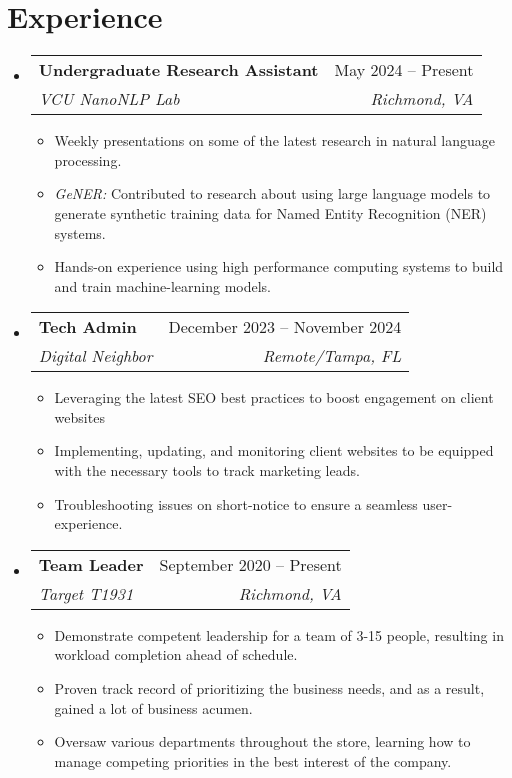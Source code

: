 \documentclass[letterpaper,11pt]{article}
\makeatletter
\newcommand{\resumeItem}[1]{
  \item\small{
    {#1 \vspace{-2pt}}
  }
}
\newcommand{\resumeSubheading}[4]{
  \vspace{-2pt}\item
    \begin{tabular*}{0.97\textwidth}[t]{l@{\extracolsep{\fill}}r}
      \textbf{#1} & #2 \\
      \textit{\small#3} & \textit{\small #4} \\
    \end{tabular*}\vspace{-7pt}
}
\newcommand{\resumeSubSubheading}[2]{
    \item
    \begin{tabular*}{0.97\textwidth}{l@{\extracolsep{\fill}}r}
      \textit{\small#1} & \textit{\small #2} \\
    \end{tabular*}\vspace{-7pt}
}
\newcommand{\resumeSubHeadingListStart}{\begin{itemize}[leftmargin=0.15in, label={}]}
\newcommand{\resumeSubHeadingListEnd}{\end{itemize}}
\newcommand{\resumeItemListStart}{\begin{itemize}}
\newcommand{\resumeItemListEnd}{\end{itemize}\vspace{-5pt}}
\makeatother
\begin{document}
\section{Experience}
  \resumeSubHeadingListStart

    \resumeSubheading
      {Undergraduate Research Assistant}{May 2024 -- Present}
      {VCU NanoNLP Lab}{Richmond, VA}
      \resumeItemListStart
        \resumeItem{Weekly presentations on some of the latest research in natural language processing.}
        \resumeItem{\emph{GeNER:} Contributed to research about using large language models to generate synthetic training data for Named Entity Recognition (NER) systems.}
        \resumeItem{Hands-on experience using high performance computing systems to build and train machine-learning models. }
      \resumeItemListEnd
      

    \resumeSubheading
      {Tech Admin}{December 2023 -- November 2024}
      {Digital Neighbor}{Remote/Tampa, FL}
      \resumeItemListStart
        \resumeItem{Leveraging the latest SEO best practices to boost engagement on client websites}
        \resumeItem{Implementing, updating, and monitoring client websites to be equipped with the necessary tools to track marketing leads.}
        \resumeItem{Troubleshooting issues on short-notice to ensure a seamless user-experience.}
    \resumeItemListEnd

    \resumeSubheading
      {Team Leader}{September 2020 -- Present}
      {Target T1931}{Richmond, VA}
      \resumeItemListStart
        \resumeItem{Demonstrate competent leadership for a team of 3-15 people, resulting in workload completion ahead of schedule.}
        \resumeItem{Proven track record of prioritizing the business needs, and as a result, gained a lot of business acumen.}
        \resumeItem{Oversaw various departments throughout the store, learning how to manage competing priorities in the best interest of the company.}
      \resumeItemListEnd

  \resumeSubHeadingListEnd


\end{document}

